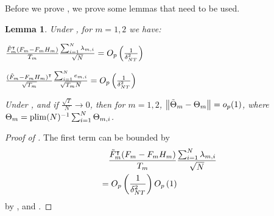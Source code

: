 \documentclass[12pt]{article}
\newtheorem{lemma}{Lemma}
\newcommand*{\tran}{\intercal}
\theoremstyle{plain}
\numberwithin{equation}{section}
\begin{document}
Before we prove , we prove some lemmas that need to be used.
\begin{lemma}
\label{lem:W_pool_remainder}
Under , for $m = 1, 2$ we have:
\begin{lemenum}
\item \label{lem:W_pool_remainder:1}
$\frac{\tilde{F}_m^\tran (F_m - F_m H_m)}{T_m} \frac{\sumN \lambda_{m, i}}{\sqrt{N}} 
= \Opdeltasq$
\item \label{lem:W_pool_remainder:2}
$\frac{(\tilde{F}_m - F_m H_m)^\tran}{\sqrt{T_m}} \frac{\sumN e_{m, i}}{\sqrt{T_m N}} 
= \Opdeltasq$
\item \label{lem:thm:9:W_pool_variance}
Under , and if $\frac{\sqrt{T}}{N} \to 0$, then for $m = 1, 2$, $\norm{\tilde{\Theta}_m - \Theta_m} = o_p(1)$, where $\Theta_m = \operatorname{plim} (N)^{-1} \sum_{i = 1}^{N} \Theta_{m, i}$.
\end{lemenum}
\end{lemma}

\begin{proof}[Proof of ]
The first term can be bounded by
\begin{align*}
&\quad \frac{\tilde{F}_m^\tran (F_m - F_m H_m)}{T_m} \frac{\sumN \lambda_{m, i}}{\sqrt{N}} \\
&= \Opdeltasq \Op{1}
\end{align*}
by , and .
\end{proof}
\end{document}
